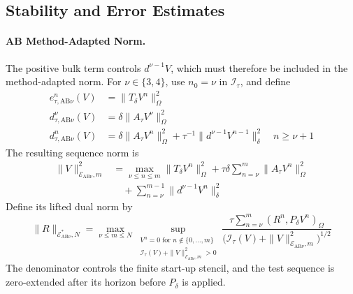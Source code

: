 \documentclass[11pt]{article}
\begin{document}

\subsection{Stability and Error Estimates}
\label{subsec:adams-bashforth-stability}

\paragraph{AB Method-Adapted Norm.}
The positive bulk term controls \(d^{\nu-1}V\), which must therefore be included
in the method-adapted norm. For \(\nu\in\{3,4\}\), use \(n_0=\nu\) in
\(\mathcal I_{\tau}\), and define
\begin{align}
e_{\tau,\mathrm{AB}\nu}^n(V)
&=\|T_{\delta}V^n\|_{\Omega}^2 \label{eq:ab-method-energy}\\
d_{\tau,\mathrm{AB}\nu}^\nu(V)
&=\delta\|A_{\tau}V^\nu\|_{\Omega}^2 \label{eq:ab-initial-dissipation}\\
d_{\tau,\mathrm{AB}\nu}^n(V)
&=\delta\|A_{\tau}V^n\|_{\Omega}^2
+\tau^{-1}\|d^{\nu-1}V^{n-1}\|_{\delta}^2
\quad n\ge \nu+1 \label{eq:ab-method-dissipation}
\end{align}
The resulting sequence norm is
\begin{align}
\|V\|_{\mathcal E_{\mathrm{AB}\nu},m}^2
&=\max_{\nu\le n\le m}\|T_{\delta}V^n\|_{\Omega}^2
+\tau\delta\sum_{n=\nu}^m\|A_{\tau}V^n\|_{\Omega}^2 \label{eq:ab-method-adapted-norm-main}\\
&\quad+\sum_{n=\nu}^{m-1}\|d^{\nu-1}V^n\|_{\delta}^2
\label{eq:ab-method-adapted-norm-increment}
\end{align}
Define its lifted dual norm by
\begin{equation}
\|R\|_{\mathcal E_{\mathrm{AB}\nu}^*,N}
=\max_{\nu\le m\le N}
\sup_{\substack{V^n=0\text{ for }n\notin\{0,\ldots,m\}\\
\mathcal I_{\tau}(V)+\|V\|_{\mathcal E_{\mathrm{AB}\nu},m}^2>0}}
\frac{\tau\sum_{n=\nu}^m(R^n,P_{\delta}V^n)_{\Omega}}
{\bigl(\mathcal I_{\tau}(V)
+\|V\|_{\mathcal E_{\mathrm{AB}\nu},m}^2\bigr)^{1/2}}
\label{eq:ab-lifted-dual-norm}
\end{equation}
The denominator controls the finite start-up stencil, and the test sequence
is zero-extended after its horizon before \(P_{\delta}\) is applied.
\end{document}
